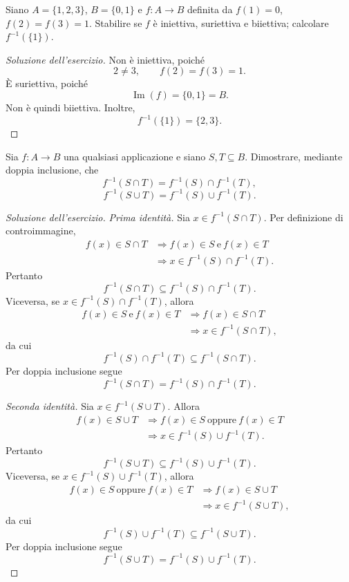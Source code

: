 \clearpage

\begin{exercise}
\label{ex:fondamenti-iniettivita-suriettivita-finiti}
Siano $A=\{1,2,3\}$, $B=\{0,1\}$ e
$f\colon A\longrightarrow B$ definita da
$f(1)=0$, $f(2)=f(3)=1$. Stabilire se $f$ è
iniettiva, suriettiva e biiettiva; calcolare $f^{-1}(\{1\})$.
\end{exercise}
\begin{proof}[Soluzione dell'esercizio]
Non è iniettiva, poiché
\[
  2\ne3,\qquad f(2)=f(3)=1.
\]
È suriettiva, poiché
\[
  \operatorname{Im}(f)=\{0,1\}=B.
\]
Non è quindi biiettiva. Inoltre,
\[
  f^{-1}(\{1\})=\{2,3\}.
\]
\end{proof}

\begin{exercise}
\label{ex:fondamenti-controimmagini-operazioni-insiemistiche}
Sia $f\colon A\longrightarrow B$ una qualsiasi applicazione
e siano $S,T\subseteq B$. Dimostrare, mediante doppia inclusione, che
\[
  f^{-1}(S\cap T)=f^{-1}(S)\cap f^{-1}(T),
\]
\[
  f^{-1}(S\cup T)=f^{-1}(S)\cup f^{-1}(T).
\]
\end{exercise}
\begin{proof}[Soluzione dell'esercizio]
\emph{Prima identità.}
Sia $x\in f^{-1}(S\cap T)$. Per definizione di controimmagine,
\[
\begin{aligned}
  f(x)\in S\cap T
    &\Longrightarrow f(x)\in S\ \text{e}\ f(x)\in T\\
    &\Longrightarrow x\in f^{-1}(S)\cap f^{-1}(T).
\end{aligned}
\]
Pertanto
\[
  f^{-1}(S\cap T)\subseteq f^{-1}(S)\cap f^{-1}(T).
\]
Viceversa, se $x\in f^{-1}(S)\cap f^{-1}(T)$, allora
\[
\begin{aligned}
  f(x)\in S\ \text{e}\ f(x)\in T
    &\Longrightarrow f(x)\in S\cap T\\
    &\Longrightarrow x\in f^{-1}(S\cap T),
\end{aligned}
\]
da cui
\[
  f^{-1}(S)\cap f^{-1}(T)\subseteq f^{-1}(S\cap T).
\]
Per doppia inclusione segue
\[
  f^{-1}(S\cap T)=f^{-1}(S)\cap f^{-1}(T).
\]

\emph{Seconda identità.}
Sia $x\in f^{-1}(S\cup T)$. Allora
\[
\begin{aligned}
  f(x)\in S\cup T
    &\Longrightarrow f(x)\in S\ \text{oppure}\ f(x)\in T\\
    &\Longrightarrow x\in f^{-1}(S)\cup f^{-1}(T).
\end{aligned}
\]
Pertanto
\[
  f^{-1}(S\cup T)\subseteq f^{-1}(S)\cup f^{-1}(T).
\]
Viceversa, se $x\in f^{-1}(S)\cup f^{-1}(T)$, allora
\[
\begin{aligned}
  f(x)\in S\ \text{oppure}\ f(x)\in T
    &\Longrightarrow f(x)\in S\cup T\\
    &\Longrightarrow x\in f^{-1}(S\cup T),
\end{aligned}
\]
da cui
\[
  f^{-1}(S)\cup f^{-1}(T)\subseteq f^{-1}(S\cup T).
\]
Per doppia inclusione segue
\[
  f^{-1}(S\cup T)=f^{-1}(S)\cup f^{-1}(T).
\]
\end{proof}
